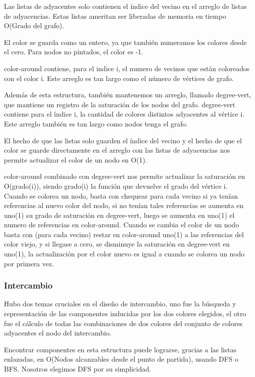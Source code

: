 \documentclass[a4paper,10pt]{article}
\begin{document}
Las listas de adyacentes solo contienen el índice del vecino en el arreglo de listas de adyacencias. Estas listas ameritan ser liberadas de memoria en tiempo O(Grado del grafo).

El color se guarda como un entero, ya que también numeramos los colores desde el cero. Para nodos no pintados, el color es -1.

color-around contiene, para el indice i, el numero de vecinos que están coloreados con el color i. Este arreglo es tan largo como el número de vértices de grafo.

Además de esta estructura, también mantenemos un arreglo, llamado degree-vert, que mantiene un registro de la saturación de los nodos del grafo. degree-vert contiene para el índice i, la cantidad de colores distintos adyacentes al vértice i. Este arreglo también es tan largo como nodos tenga el grafo.

El hecho de que las listas solo guarden el índice del vecino y el hecho de que el color se guarde directamente en el arreglo con las listas de adyacencias nos permite actualizar el color de un nodo en O(1).

color-around combinado con degree-vert nos permite actualizar la saturación en O(grado(i)), siendo grado(i) la función que devuelve el grado del vértice i. Cuando se colorea un nodo, basta con chequear para cada vecino si ya tenían referencias al nuevo color del nodo, si no tenían tales referencias se aumenta en uno(1) su grado de saturación en degree-vert, luego se aumenta en uno(1) el numero de referencias en color-around. Cuando se cambia el color de un nodo basta con (para cada vecino) restar en color-around uno(1) a las referencias del color viejo, y si llegase a cero, se disminuye la saturación en degree-vert en uno(1), la actualización por el color nuevo es igual a cuando se colorea un nodo por primera vez.

\subsubsection{Intercambio}

Hubo dos temas cruciales en el diseño de intercambio, uno fue la búsqueda y representación de las componentes inducidas por los dos colores elegidos, el otro fue el cálculo de todas las combinaciones de dos colores del conjunto de colores adyacentes el nodo del intercambio.

Encontrar componentes en esta estructura puede lograrse, gracias a las listas enlazadas, en O(Nodos alcanzables desde el punto de partida), usando DFS o BFS. Nosotros elegimos DFS por su simplicidad.
\end{document}
